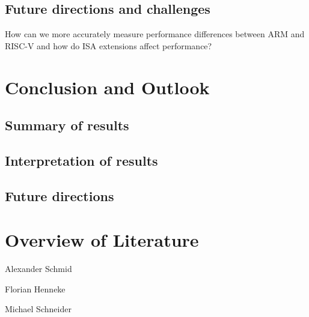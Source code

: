 \documentclass[conference]{IEEEtran}
\begin{document}
	\subsection{Future directions and challenges}
	How can we more accurately measure performance differences between ARM and RISC-V and how do ISA extensions affect performance?

\section{Conclusion and Outlook}
\label{ref:conclusion}
	\subsection{Summary of results}
	\subsection{Interpretation of results}
	\subsection{Future directions}


\section{Overview of Literature}
Alexander Schmid \cite{Akram2017} \cite{Arm2020} \cite{Asanovic2014} \cite{HeuiLee2001} \cite{Patterson2019} \cite{Perotti2020} \cite{Shore2015} \cite{Waterman2016} \cite{Xu2003}

Florian Henneke \cite{Waterman2016} \cite{Ryzhyk2006} \cite{Asanovic2014} \cite{Furber2000} \cite{Microsoft2020} \cite{Greenwaves2020} \cite{Aws2020} \cite{Microsoft2020}

Michael Schneider \cite{Waterman2017} \cite{Arm2020} \cite{George1990} \cite{Waterman2016} \cite{50years} \cite{hennessy2012computer} \cite{drechsler2020enhanced} \cite{WisconsinMadison2016} \cite{IEEE2018} \cite{Dirvin2019} \cite{Bandic2019} \cite{Berkeley2019}



\end{document}
